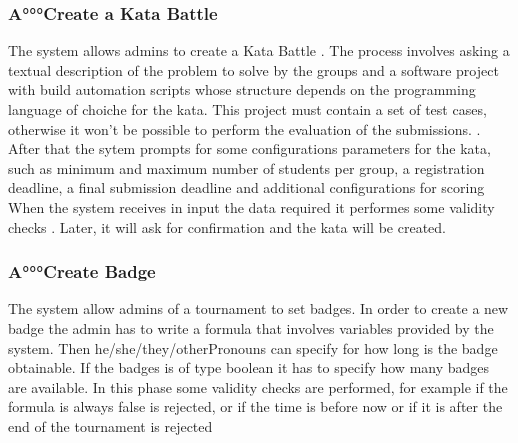 \documentclass{article}
\newcommand{\admins}{admins }
\newcommand{\groups}{groups }
\begin{document}
            \subsubsection{A°°°Create a Kata Battle}
                The system allows \admins to create a Kata Battle
                . The process involves asking a
                textual description of the problem to solve by the \groups and a software project with build automation scripts whose structure depends on the programming language of choiche for the kata. This project must contain a set of test cases, otherwise it won't be possible to perform the evaluation of the submissions. 
                .
                After that the sytem prompts for some configurations parameters for the kata, such as minimum and maximum number of students per group, a registration deadline, a final submission deadline
                and additional configurations for scoring
                \\

                When the system receives in input the data required it performes some validity checks
                .
                 Later, it will ask for confirmation and the kata will be created.
                
            \subsubsection{A°°°Create Badge}
                The system allow \admins of a tournament to set badges. In order to create a new badge the admin has to write a formula that involves variables provided by the system. Then he/she/they/otherPronouns can specify for how long is the badge obtainable. If the badges is of type boolean it has to specify how many badges are available. In this phase some validity checks are performed, for example if the formula is always false is rejected, or if the time is before now or if it is after the end of the tournament is rejected
                
\end{document}
